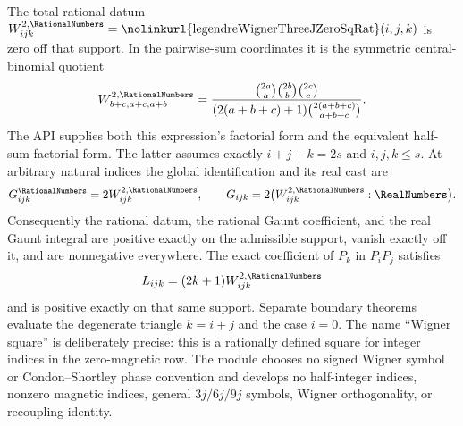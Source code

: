 \documentclass[11pt,oneside]{article}
\theoremstyle{definition}
\theoremstyle{remark}
\newcommand{\lean}[1]{%
  \ifmmode\text{\nolinkurl{#1}}\else\nolinkurl{#1}\fi}
\begin{document}
The total rational datum
\(W_{ijk}^{2,\RationalNumbers}=
\lean{legendreWignerThreeJZeroSqRat}(i,j,k)\) is zero off that support.  In the
pairwise-sum coordinates it is the symmetric central-binomial quotient
\[
 W_{b+c,a+c,a+b}^{2,\RationalNumbers}
 =\frac{\binom{2a}{a}\binom{2b}{b}\binom{2c}{c}}
 {(2(a+b+c)+1)\binom{2(a+b+c)}{a+b+c}}.
\]
The API supplies both this expression's factorial form and the equivalent half-sum
factorial form.  The latter assumes exactly \(i+j+k=2s\) and
\(i,j,k\leq s\).  At arbitrary natural indices the global identification and its real
cast are
\[
 G_{ijk}^{\RationalNumbers}=2W_{ijk}^{2,\RationalNumbers},
 \qquad
 G_{ijk}=2\bigl(W_{ijk}^{2,\RationalNumbers}:\RealNumbers\bigr).
\]
Consequently the rational datum, the rational Gaunt coefficient, and the real Gaunt
integral are positive exactly on the admissible support, vanish exactly off it, and are
nonnegative everywhere.  The exact coefficient of \(P_k\) in \(P_iP_j\) satisfies
\[
 L_{ijk}=(2k+1)W_{ijk}^{2,\RationalNumbers}
\]
and is positive exactly on that same support.  Separate boundary theorems evaluate the
degenerate triangle \(k=i+j\) and the case \(i=0\).  The name ``Wigner square'' is
deliberately precise: this is a rationally defined square for integer indices in the
zero-magnetic row.  The module chooses no signed Wigner symbol or Condon--Shortley phase
convention and develops
no half-integer indices, nonzero magnetic indices, general \(3j/6j/9j\) symbols, Wigner
orthogonality, or recoupling identity.
\end{document}
